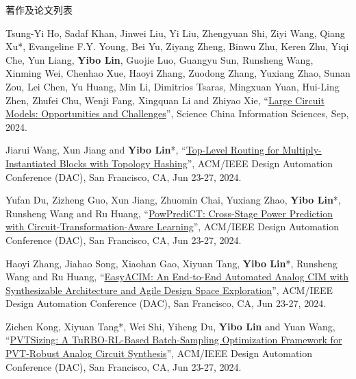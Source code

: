 \begin{rSection}{著作及论文列表}
\begin{description}[font=\normalfont, rightmargin=2em]
{}
            

\item[{[J157]}]{
        Tsung-Yi Ho, Sadaf Khan, Jinwei Liu, Yi Liu, Zhengyuan Shi, Ziyi Wang, Qiang Xu*, Evangeline F.Y. Young, Bei Yu, Ziyang Zheng, Binwu Zhu, Keren Zhu, Yiqi Che, Yun Liang, \textbf{Yibo Lin}, Guojie Luo, Guangyu Sun, Runsheng Wang, Xinming Wei, Chenhao Xue, Haoyi Zhang, Zuodong Zhang, Yuxiang Zhao, Sunan Zou, Lei Chen, Yu Huang, Min Li, Dimitrios Tsaras, Mingxuan Yuan, Hui-Ling Zhen, Zhufei Chu, Wenji Fang, Xingquan Li and Zhiyao Xie, 
    ``\href{https://doi.org/10.1007/s11432-024-4155-7}{Large Circuit Models: Opportunities and Challenges}'', 
    Science China Information Sciences, Sep, 2024.
    
}
            

\item[{[C156]}]{
        Jiarui Wang, Xun Jiang and \textbf{Yibo Lin}*, 
    ``\href{https://doi.org/10.1145/3649329.3655900}{Top-Level Routing for Multiply-Instantiated Blocks with Topology Hashing}'', 
    ACM/IEEE Design Automation Conference (DAC), San Francisco, CA, Jun 23-27, 2024.
    
}
            

\item[{[C155]}]{
        Yufan Du, Zizheng Guo, Xun Jiang, Zhuomin Chai, Yuxiang Zhao, \textbf{Yibo Lin}*, Runsheng Wang and Ru Huang, 
    ``\href{https://doi.org/10.1145/3649329.3657349}{PowPrediCT: Cross-Stage Power Prediction with Circuit-Transformation-Aware Learning}'', 
    ACM/IEEE Design Automation Conference (DAC), San Francisco, CA, Jun 23-27, 2024.
    
}
            

\item[{[C154]}]{
        Haoyi Zhang, Jiahao Song, Xiaohan Gao, Xiyuan Tang, \textbf{Yibo Lin}*, Runsheng Wang and Ru Huang, 
    ``\href{https://doi.org/10.1145/3649329.3656229}{EasyACIM: An End-to-End Automated Analog CIM with Synthesizable Architecture and Agile Design Space Exploration}'', 
    ACM/IEEE Design Automation Conference (DAC), San Francisco, CA, Jun 23-27, 2024.
    
}
            

\item[{[C153]}]{
        Zichen Kong, Xiyuan Tang*, Wei Shi, Yiheng Du, \textbf{Yibo Lin} and Yuan Wang, 
    ``\href{https://doi.org/10.1145/3649329.3661850}{PVTSizing: A TuRBO-RL-Based Batch-Sampling Optimization Framework for PVT-Robust Analog Circuit Synthesis}'', 
    ACM/IEEE Design Automation Conference (DAC), San Francisco, CA, Jun 23-27, 2024.
    
}
\end{description}
\end{rSection}
